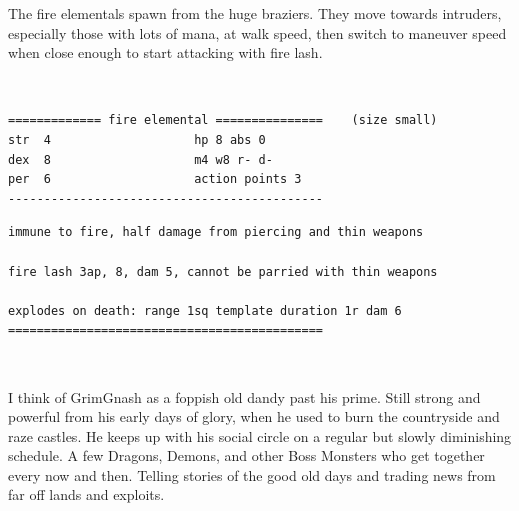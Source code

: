 The fire elementals spawn from the huge braziers. They move towards intruders, especially those with lots of mana, at walk speed, then switch to maneuver speed when close enough to start attacking with fire lash.

\

\small \begin{samepage} \begin{verbatim}
============= fire elemental ===============    (size small)
str  4                    hp 8 abs 0
dex  8                    m4 w8 r- d-
per  6                    action points 3
--------------------------------------------
\end{verbatim} \end{samepage} \goodbreak \begin{samepage} \begin{verbatim}
immune to fire, half damage from piercing and thin weapons

fire lash 3ap, 8, dam 5, cannot be parried with thin weapons

explodes on death: range 1sq template duration 1r dam 6
============================================
\end{verbatim} \end{samepage} \normalsize

\


\begin{readoutloud}
I think of GrimGnash as a foppish old dandy past his prime. Still strong and powerful from his early days of glory, when he used to burn the countryside and raze castles. He keeps up with his social circle on a regular but slowly diminishing schedule. A few Dragons, Demons, and other Boss Monsters who get together every now and then. Telling stories of the good old days and trading news from far off lands and exploits. 
\end{readoutloud}


































